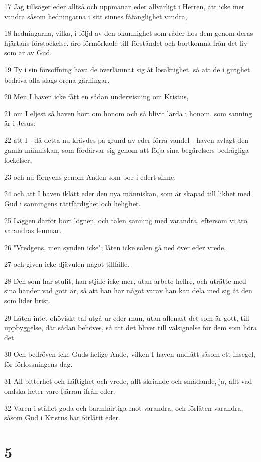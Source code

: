 \par 17 Jag tillsäger eder alltså och uppmanar eder allvarligt i Herren, att icke mer vandra såsom hedningarna i sitt sinnes fåfänglighet vandra,
\par 18 hedningarna, vilka, i följd av den okunnighet som råder hos dem genom deras hjärtans förstockelse, äro förmörkade till förståndet och bortkomna från det liv som är av Gud.
\par 19 Ty i sin försoffning hava de överlämnat sig åt lösaktighet, så att de i girighet bedriva alla slags orena gärningar.
\par 20 Men I haven icke fått en sådan undervisning om Kristus,
\par 21 om I eljest så haven hört om honom och så blivit lärda i honom, som sanning är i Jesus:
\par 22 att I - då detta nu krävdes på grund av eder förra vandel - haven avlagt den gamla människan, som fördärvar sig genom att följa sina begärelsers bedrägliga lockelser,
\par 23 och nu förnyens genom Anden som bor i edert sinne,
\par 24 och att I haven iklätt eder den nya människan, som är skapad till likhet med Gud i sanningens rättfärdighet och helighet.
\par 25 Läggen därför bort lögnen, och talen sanning med varandra, eftersom vi äro varandras lemmar.
\par 26 "Vredgens, men synden icke"; låten icke solen gå ned över eder vrede,
\par 27 och given icke djävulen något tillfälle.
\par 28 Den som har stulit, han stjäle icke mer, utan arbete hellre, och uträtte med sina händer vad gott är, så att han har något varav han kan dela med sig åt den som lider brist.
\par 29 Låten intet ohöviskt tal utgå ur eder mun, utan allenast det som är gott, till uppbyggelse, där sådan behöves, så att det bliver till välsignelse för dem som höra det.
\par 30 Och bedröven icke Guds helige Ande, vilken I haven undfått såsom ett insegel, för förlossningens dag.
\par 31 All bitterhet och häftighet och vrede, allt skriande och smädande, ja, allt vad ondska heter vare fjärran ifrån eder.
\par 32 Varen i stället goda och barmhärtiga mot varandra, och förlåten varandra, såsom Gud i Kristus har förlåtit eder.

\chapter{5}

